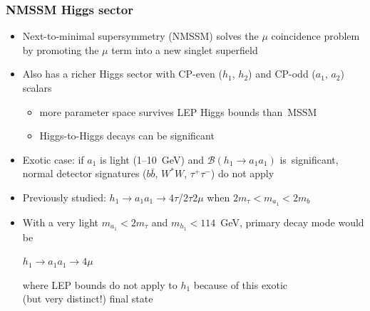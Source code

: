 \documentclass[compress]{beamer}
\begin{document}
\begin{frame}
\frametitle{NMSSM Higgs sector}

\begin{itemize}\setlength{\itemsep}{0.2 cm}
\item Next-to-minimal supersymmetry (NMSSM) solves the $\mu$
  coincidence problem by promoting the $\mu$ term into a new singlet
  superfield
\item Also has a richer Higgs sector with CP-even ($h_1$, $h_2$)
  and CP-odd ($a_1$, $a_2$) scalars
\begin{itemize}
\item more parameter space survives LEP Higgs bounds \mbox{than MSSM\hspace{-1 cm}}
\item Higgs-to-Higgs decays can be significant
\end{itemize}
\item Exotic case: if $a_1$ is light (1--10~GeV) and $\mathcal{B}(h_1
  \to a_1 a_1)$ \mbox{is significant,\hspace{-1 cm}} normal detector signatures ($b\bar{b}$, $W^*W$, $\tau^+\tau^-$) do not apply
\item Previously studied: $h_1 \to a_1 a_1 \to 4\tau$/$2\tau 2\mu$ when $2m_\tau < m_{a_1} < 2m_b$
\item With a very light $m_{a_1} < 2m_\tau$ and $m_{h_1} < 114$~GeV, primary decay mode would be

\vspace{-0.5 cm}
\begin{center}
$h_1 \to a_1 a_1 \to 4\mu$
\end{center}
where LEP bounds do not apply to $h_1$ because of this exotic \\ (but very distinct!) final state
\end{itemize}
\end{frame}
\end{document}
